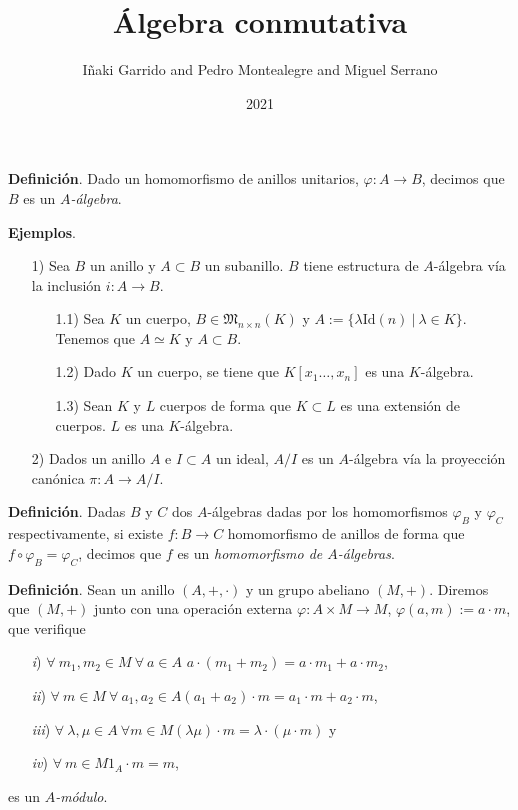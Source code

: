 \documentclass[a4paper,12pt]{article}
\begin{document}
\title{Álgebra conmutativa}
\author{Iñaki Garrido and Pedro Montealegre and Miguel Serrano}
\date{2021}
\maketitle

\textbf{Definición}. Dado un homomorfismo de anillos unitarios, $\varphi: A\longrightarrow B$, decimos que $B$ es un \textit{$A$-álgebra}.

\textbf{Ejemplos}.\begin{itemize}
    \item[1)]Sea $B$ un anillo y $A\subset B$ un subanillo. $B$ tiene estructura de $A$-álgebra vía la inclusión $i: A\longrightarrow B$.\begin{itemize}
        \item[1.1)]Sea $K$ un cuerpo, $B\in\mathfrak{M}_{n\times n}(K)$ y $A:=\{\lambda\text{Id}(n)\ |\ \lambda\in K\}$. Tenemos que $A\simeq K$ y $A\subset B$.
        \item[1.2)] Dado $K$ un cuerpo, se tiene que $K[x_1\dots,x_n]$ es una $K$-álgebra.
        \item[1.3)] Sean $K$ y $L$ cuerpos de forma que $K\subset L$ es una extensión de cuerpos. $L$ es una $K$-álgebra.
    \end{itemize}
    \item[2)] Dados un anillo $A$ e $I\subset A$ un ideal, $A/I$ es un $A$-álgebra vía la proyección canónica $\pi: A\longrightarrow A/I$.
\end{itemize}

\textbf{Definición}. Dadas $B$ y $C$ dos $A$-álgebras dadas por los homomorfismos $\varphi_B$ y $\varphi_C$ respectivamente, si existe $f: B\longrightarrow C$ homomorfismo de anillos de forma que $f\circ \varphi_B=\varphi_C$, decimos que $f$ es un \textit{homomorfismo de $A$-álgebras}.

\textbf{Definición}. Sean un anillo $(A,+,\cdot)$ y un grupo abeliano $(M,+)$.
Diremos que $(M,+)$ junto con una operación externa $\varphi: A\times M\longrightarrow M$, $\varphi(a,m):=a\cdot m$, que verifique
\begin{itemize}
    \item[\textit{i})] $\forall\ m_1,m_2\in M\ \forall\ a\in A$\hspace{15pt} $a\cdot(m_1+m_2)=a\cdot m_1+a\cdot m_2$,
    \item[\textit{ii})] $\forall\ m\in M\ \forall\ a_1,a_2\in A$\hspace{15pt}$(a_1+a_2)\cdot m=a_1\cdot m+a_2\cdot m$,
    \item[\textit{iii})]$\forall\ \lambda,\mu\in A\ \forall m\in M$\hspace{15pt}$(\lambda\mu)\cdot m=\lambda\cdot(\mu\cdot m)$ y
    \item[\textit{iv})]$\forall\ m\in M$\hspace{15pt}$1_A\cdot m=m$,
\end{itemize}es un \textit{$A$-módulo}.
\end{document}
